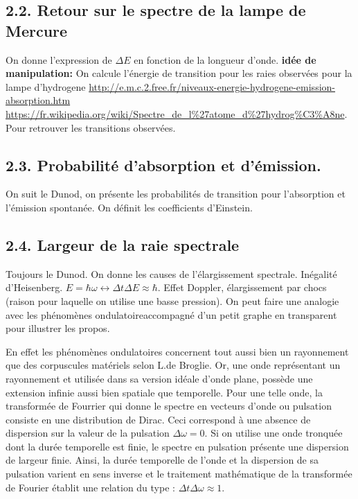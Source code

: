 \documentclass[french, a4paper, 10pt, twocolumn, landscape]{article}
\begin{document}
\subsection*{2.2. Retour sur le spectre de la lampe de Mercure}

On donne l'expression de $\Delta E$ en fonction de la longueur d'onde. 
\textbf{idée de manipulation:} On calcule l'énergie de transition pour les raies observées pour la lampe d'hydrogene
\url{http://e.m.c.2.free.fr/niveaux-energie-hydrogene-emission-absorption.htm} \url{https://fr.wikipedia.org/wiki/Spectre_de_l%27atome_d%27hydrog%C3%A8ne}. Pour retrouver les transitions observées.

\subsection*{2.3. Probabilité d'absorption et d'émission.}

On suit le Dunod, on présente les probabilités de transition pour l'absorption et l'émission spontanée. On définit les coefficients d'Einstein.

\subsection*{2.4. Largeur de la raie spectrale}

Toujours le Dunod. On donne les causes de l'élargissement spectrale. Inégalité d'Heisenberg. $E=\hbar\omega\leftrightarrow \Delta t\Delta E\approx \hbar$. Effet Doppler, élargissement par chocs (raison pour laquelle on utilise une basse pression). On peut faire une analogie avec les phénomènes ondulatoireaccompagné d'un petit graphe en transparent pour illustrer les propos.\medskip

\textcolor{gray!40}{En effet les phénomènes ondulatoires concernent tout aussi bien un rayonnement que des corpuscules matériels selon L.de Broglie. Or, une onde représentant un rayonnement et utilisée dans sa version idéale d'onde plane, possède une extension infinie aussi bien spatiale que temporelle. Pour une telle onde, la transformée de Fourrier qui donne le spectre en vecteurs d'onde ou pulsation consiste en une distribution de Dirac. Ceci correspond à une absence de dispersion sur la valeur de la pulsation $\Delta \omega = 0$. Si on utilise une onde tronquée dont la durée temporelle  est finie, le spectre en pulsation présente une dispersion de largeur finie. Ainsi, la durée temporelle de l'onde et la dispersion de sa pulsation varient en sens inverse et le traitement mathématique de la transformée de Fourier établit une relation du type : $\Delta t\Delta\omega\approx 1$.}
\end{document}
